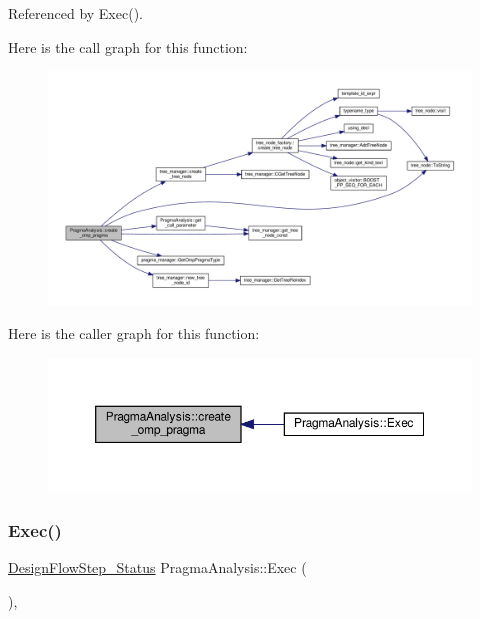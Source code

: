 Referenced by Exec().

Here is the call graph for this function\+:
\nopagebreak
\begin{figure}[H]
\begin{center}
\leavevmode
\includegraphics[width=350pt]{d1/d63/classPragmaAnalysis_ad01dc50d645a9d61e4bf56fdb2ed34f0_cgraph}
\end{center}
\end{figure}
Here is the caller graph for this function\+:
\nopagebreak
\begin{figure}[H]
\begin{center}
\leavevmode
\includegraphics[width=350pt]{d1/d63/classPragmaAnalysis_ad01dc50d645a9d61e4bf56fdb2ed34f0_icgraph}
\end{center}
\end{figure}
\mbox{\label{classPragmaAnalysis_a972bd7b68f27335d6fbf6e1d327c2663}} 
\subsubsection{\texorpdfstring{Exec()}{Exec()}}
{\footnotesize\ttfamily \hyperlink{design__flow__step_8hpp_afb1f0d73069c26076b8d31dbc8ebecdf}{Design\+Flow\+Step\+\_\+\+Status} Pragma\+Analysis\+::\+Exec (\begin{DoxyParamCaption}{ }\end{DoxyParamCaption})\hspace{0.3cm}{\ttfamily [override]}, {\ttfamily [virtual]}}



